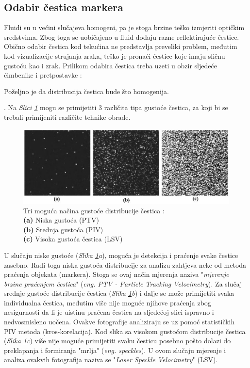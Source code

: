 \subsection{Odabir čestica markera}
Fluidi su u većini slučajeva homogeni, pa je stoga brzine teško izmjeriti optičkim sredstvima. Zbog toga se uobičajeno u fluid dodaju razne reflektirajuće čestice. Obično odabir čestica kod tekućina ne predstavlja preveliki problem, međutim kod vizualizacije strujanja zraka, teško je pronaći čestice koje imaju sličnu gustoću kao i zrak. Prilikom odabira čestica treba uzeti u obzir sljedeće čimbenike i pretpostavke  \cite{raffel2018_book}:
\begin{description}[style=unboxed,leftmargin=0cm]
	\item[Distribucija čestica markera u struji fluida.] Poželjno je da distribucija čestica bude što homogenija.
	\item[Gustoća distribucije čestica markera unutar domene]. Na \textit{Slici \ref{sl:2.2}} mogu se primijetiti 3 različita tipa gustoće čestica, za koji bi se trebali primijeniti različite tehnike obrade.
	\begin{figure}[h]  
		\centering
		\includegraphics[width=14cm]{./2_DPIV/2_2GustocaDistribucijeCestica.jpg} 
		\caption{Tri moguća načina gustoće distribucije čestica \cite{raffel2018_book}:\\ \textbf{(a)} Niska gustoća (PTV)\\ \textbf{(b)} Srednja gustoća (PIV)\\ \textbf{(c)} Visoka gustoća čestica (LSV)}
		\label{sl:2.2}
	\end{figure}
	U slučaju niske gustoće (\textit{Slika \ref{sl:2.2}a}), moguća je detekcija i praćenje svake čestice zasebno. Radi toga niska gustoća distribucije za analizu zahtjeva neke od metoda praćenja objekata (markera). Stoga se ovaj način mjerenja naziva "\textit{mjerenje brzine praćenjem čestica}" (\textit{eng. PTV - Particle Tracking Velocimetry}). Za slučaj srednje gustoće distribucije čestica (\textit{Slika \ref{sl:2.2}b}) i dalje se može primijetiti svaka individualna čestica, međutim više nije moguće njihove praćenja zbog nesigurnosti da li je uistinu praćena čestica na sljedećoj slici ispravno i nedvosmisleno uočena. Ovakve fotografije analiziraju se uz pomoć statističkih PIV metoda (kros-korelacija). Kod slika sa visokom gustoćom distribucije čestica (\textit{Slika \ref{sl:2.2}c}) više nije moguće primijetiti svaku česticu posebno pošto dolazi do preklapanja i formiranja "mrlja" (\textit{eng. speckles}). U ovom slučaju mjerenje i analiza ovakvih fotografija naziva se "\textit{Laser Speckle Velocimetry}" (LSV).

\end{description}
